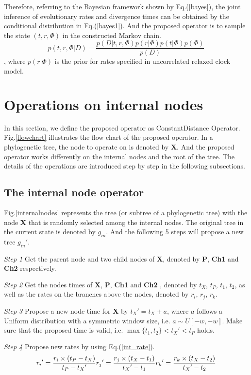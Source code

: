 \documentclass{bmcart}
\begin{document}
Therefore, referring to the Bayesian framework shown by Eq.(\ref{bayes}), the joint inference of evolutionary rates and divergence times can be obtained by the conditional distribution in Eq.(\ref{bayes1}). And the proposed operator is to sample the state $(t,r,\Phi)$ in the constructed Markov chain.
\begin{equation}\label{bayes1}
p(t,r,\Phi |D) = \frac{{p(D|t,r,\Phi )p(r|\Phi )p(t|\Phi )p(\Phi )}}{{p(D)}}
\end{equation}
, where $p(r|\Phi )$ is the prior for rates specified in uncorrelated relaxed clock model.
\section*{Operations on internal nodes}
In this section, we define the proposed operator as ConstantDistance Operator. Fig.\ref{flowchart} illustrates the flow chart of the proposed operator. In a phylogenetic tree, the node to operate on is denoted by \textbf{X}. And the proposed operator works differently on the internal nodes and the root of the tree. The details of the operations are introduced step by step in the following subsections.
\subsection*{The internal node operator}
Fig.\ref{internalnodes} represents the tree (or subtree of a phylogenetic tree) with the node \textbf{X} that is randomly selected among the internal nodes. The original tree in the current state is denoted by $g_{in}$. And the following 5 steps will propose a new tree ${g_{in}}'$.

\emph{Step 1} Get the parent node and two child nodes of \textbf{X}, denoted by \textbf{P}, \textbf{Ch1} and \textbf{Ch2} respectively.

\emph{Step 2} Get the nodes times of \textbf{X}, \textbf{P}, \textbf{Ch1} and \textbf{Ch2} , denoted by $t_X$, $t_P$, $t_1$, $t_2$, as well as the rates on the branches above the nodes, denoted by $r_i$, $r_j$, $r_k$.

\emph{Step 3} Propose a new node time for \textbf{X} by ${t_X}' = {t_X} + a$, where $a$ follows a Uniform distribution with a symmetric window size, i.e. $a \sim U[ - w, + w]$. Make sure that the proposed time is valid, i.e. $\max \{ {t_1},{t_2}\}  < {t_X}' < {t_P}$ holds.

\emph{Step 4} Propose new rates by using Eq.(\ref{int_rate}).
\begin{equation}
 \label{int_rate}
{r_i}' = \frac{{r_i} \times ({{t_P} - {t_X}})}{{{t_P} - {t_X}'}}\\
{r_j}' = \frac{{{r_j} \times ({{t_X} - {t_1}})}}{{{t_X}' - {t_1}}}\\
{r_k}' = \frac{{{r_k} \times ({{t_X} - {t_2}})}}{{{t_X}' - {t_2}}}
 \end{equation}
\end{document}
